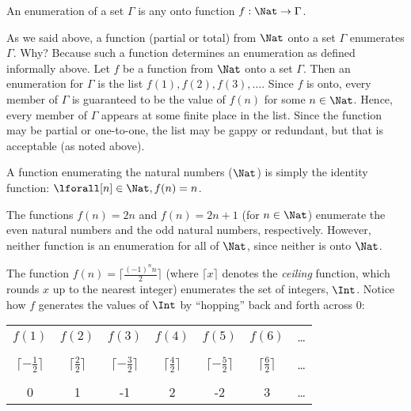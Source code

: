 \documentclass[../../include/open-logic-section]{subfiles}
\begin{document}
\begin{defn}
An enumeration of a set $\Gamma$ is any onto function $f: 
\Nat \rightarrow \Gamma$.
\end{defn}

\begin{explain}
As we said above, a function (partial or total) from $\Nat$ 
onto a set $\Gamma$ enumerates $\Gamma$. Why? Because 
such a function determines an enumeration as defined informally 
above. Let $f$ be a function from $\Nat$ onto a set 
$\Gamma$. Then an enumeration for $\Gamma$ is the list $f(1), 
f(2), f(3), \dots$. Since $f$ is onto, every member of $\Gamma$ is 
guaranteed to be the value of $f(n)$ for some $n \in \Nat$. 
Hence, every member of $\Gamma$ appears at some finite place 
in the list. Since the function may be partial or one-to-one, the list 
may be gappy or redundant, but that is acceptable (as noted above).
\end{explain}

\begin{ex}
A function enumerating the natural numbers ($\Nat$) is 
simply the identity function: $\lforall[n] \in \Nat, f(n) = n$.
\end{ex}

\begin{ex}
The functions $f(n) = 2n$ and $f(n) = 2n+1$ (for $n\in\Nat$) 
enumerate the even natural numbers and the odd natural numbers, 
respectively. However, neither function is an enumeration for all of 
$\Nat$, since neither is onto $\Nat$.
\end{ex}

\begin{ex}
The function $f(n) = \lceil \frac{(-1)^n n}{2}\rceil$ (where $\lceil x 
\rceil$ denotes the \emph{ceiling} function, which rounds $x$ up 
to the nearest integer) enumerates the set of  integers, 
$\Int$. Notice how $f$ generates the values of $\Int$ 
by ``hopping'' back and forth across 0:
\center
\begin{tabular}{c c c c c c c}
$f(1)$ & $f(2)$ & $f(3)$ & $f(4)$ & $f(5)$ & $f(6)$ & \dots \\ \\
$\lceil - \tfrac{1}{2}\rceil$ & $\lceil \tfrac{2}{2} \rceil$ & $\lceil - 
\tfrac{3}{2} \rceil$ & $\lceil \tfrac{4}{2} \rceil $ & $\lceil -\tfrac{5}{2} 
\rceil$ & $\lceil \tfrac{6}{2} \rceil$ & \dots \\ \\
0 & 1 & -1 & 2 & -2 & 3 & \dots
\end{tabular}
\flushleft
\end{ex}
\end{document}
